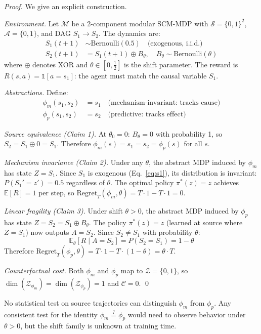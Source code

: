 \documentclass[runningheads]{llncs}
\newcommand{\phim}{\phi_m}
\newcommand{\phip}{\phi_p}
\newcommand{\Regret}{\mathrm{Regret}}
\newcommand{\E}{\mathbb{E}}
\newcommand{\Scal}{\mathcal{S}}
\newcommand{\Acal}{\mathcal{A}}
\newcommand{\Zcal}{\mathcal{Z}}
\newcommand{\Mcal}{\mathcal{M}}
\begin{document}
\begin{proof}
We give an explicit construction.

\emph{Environment.} Let $\Mcal$ be a 2-component modular SCM-MDP with $\Scal = \{0,1\}^2$, $\Acal = \{0,1\}$, and DAG $S_1 \to S_2$. The dynamics are:
\begin{align}
    S_1(t+1) &\sim \mathrm{Bernoulli}(0.5) \quad \text{(exogenous, i.i.d.)} \label{eq:s1}\\
    S_2(t+1) &= S_1(t+1) \oplus B_\theta, \quad B_\theta \sim \mathrm{Bernoulli}(\theta) \label{eq:s2}
\end{align}
where $\oplus$ denotes XOR and $\theta \in [0, \frac{1}{2}]$ is the shift parameter. The reward is $R(s, a) = \mathbb{1}[a = s_1]$: the agent must match the causal variable $S_1$.

\emph{Abstractions.} Define:
\begin{align}
    \phim(s_1, s_2) &= s_1 \quad \text{(mechanism-invariant: tracks cause)} \label{eq:phi_m}\\
    \phip(s_1, s_2) &= s_2 \quad \text{(predictive: tracks effect)} \label{eq:phi_p}
\end{align}

\emph{Source equivalence (Claim 1).} At $\theta_0 = 0$: $B_\theta = 0$ with probability 1, so $S_2 = S_1 \oplus 0 = S_1$. Therefore $\phim(s) = s_1 = s_2 = \phip(s)$ for all $s$.

\emph{Mechanism invariance (Claim 2).} Under any $\theta$, the abstract MDP induced by $\phim$ has state $Z = S_1$. Since $S_1$ is exogenous (Eq.~\ref{eq:s1}), its distribution is invariant: $P(S_1' = z') = 0.5$ regardless of $\theta$. The optimal policy $\pi^*(z) = z$ achieves $\E[R] = 1$ per step, so $\Regret_T(\phim, \theta) = T \cdot 1 - T \cdot 1 = 0$.

\emph{Linear fragility (Claim 3).} Under shift $\theta > 0$, the abstract MDP induced by $\phip$ has state $Z = S_2 = S_1 \oplus B_\theta$. The policy $\pi^*(z) = z$ (learned at source where $Z = S_1$) now outputs $A = S_2$. Since $S_2 \neq S_1$ with probability $\theta$:
\[
\E_\theta[R \mid A = S_2] = P(S_2 = S_1) = 1 - \theta
\]
Therefore $\Regret_T(\phip, \theta) = T \cdot 1 - T \cdot (1 - \theta) = \theta \cdot T$.

\emph{Counterfactual cost.} Both $\phim$ and $\phip$ map to $\Zcal = \{0, 1\}$, so $\dim(\Zcal_{\phim}) = \dim(\Zcal_{\phip}) = 1$ and $\mathcal{C} = 0$. \qed
\end{proof}

\begin{corollary}[Undetectability]
\label{cor:undetectable}
No statistical test on source trajectories can distinguish $\phim$ from $\phip$. Any consistent test for the identity $\phim \stackrel{?}{=} \phip$ would need to observe behavior under $\theta > 0$, but the shift family is unknown at training time.
\end{corollary}
\end{document}
